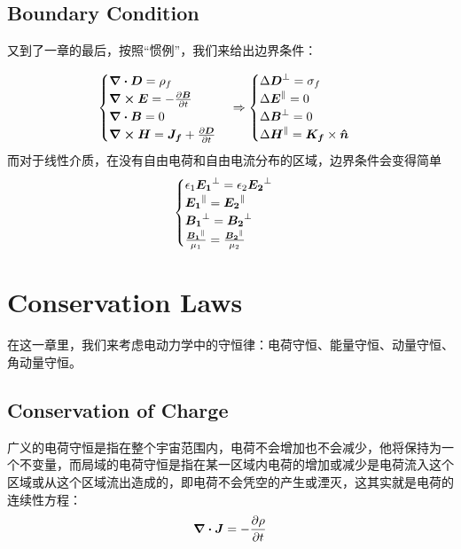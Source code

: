 \documentclass[14pt,oneside]{book}
\begin{document}
\begin{large}
\section{Boundary Condition}
又到了一章的最后，按照“惯例”，我们来给出边界条件：

\begin{align}
	\begin{cases}
		\div{\vb*{D}}=\rho_f\\
		\curl{\vb*{E}}=-\pdv{\vb*{B}}{t}\\
		\div{\vb*{B}}=0\\
		\curl{\vb*{H}}= \vb*{J_f}+\pdv{\vb*{D}}{t}
	\end{cases}\Rightarrow
	\begin{cases}
		\Delta \vb*{D}^\perp =\sigma_f\\
		\Delta \vb*{E}^\parallel = 0\\
		\Delta \vb*{B}^\perp = 0\\
		\Delta \vb*{H}^\parallel =\vb*{K_f}\times \vb*{\hat n}
	\end{cases}
\end{align}
而对于线性介质，在没有自由电荷和自由电流分布的区域，边界条件会变得简单
\begin{align}
	\begin{cases}
		\epsilon_1\vb*{E_1}^\perp=\epsilon_2\vb*{E_2}^\perp\\
		\vb*{E_1}^\parallel=\vb*{E_2}^\parallel\\
		\vb*{B_1}^\perp=\vb*{B_2}^\perp\\
		\frac{\vb*{B_1}^\parallel}{\mu_1}=\frac{\vb*{B_2}^\parallel}{\mu_2}
	\end{cases}
\end{align}


\chapter{Conservation Laws}
在这一章里，我们来考虑电动力学中的守恒律：电荷守恒、能量守恒、动量守恒、角动量守恒。
\section{Conservation of Charge}
广义的电荷守恒是指在整个宇宙范围内，电荷不会增加也不会减少，他将保持为一个不变量，而局域的电荷守恒是指在某一区域内电荷的增加或减少是电荷流入这个区域或从这个区域流出造成的，即电荷不会凭空的产生或湮灭，这其实就是电荷的连续性方程：
\begin{equation}
  \div{\vb*{J}}=-\pdv{\rho}{t}
\end{equation}

\end{large}
\end{document}
